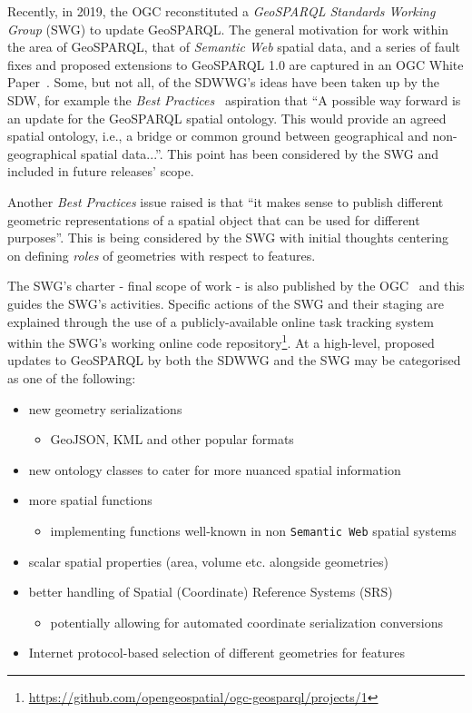 \documentclass[runningheads]{llncs}
\begin{document}
Recently, in 2019, the OGC reconstituted a \textit{GeoSPARQL Standards Working Group} (SWG) to update GeoSPARQL. The general 
motivation for work within the area of GeoSPARQL, that of \textit{Semantic Web} spatial data, and a series of
fault fixes and proposed extensions to GeoSPARQL 1.0 are captured in an OGC White Paper~\cite{geosparqlwhitepaper}. Some,
but not all, of the SDWWG's ideas have been taken up by the SDW, for example the \textit{Best Practices}~\cite{van_den_brink_best_2018}
aspiration that ``A possible way forward is an update for the GeoSPARQL spatial ontology. This would provide an 
agreed spatial ontology, i.e., a bridge or common ground between geographical and non-geographical spatial data...''.
This point has been considered by the SWG and included in future releases' scope. 

Another \textit{Best Practices} issue raised is that ``it makes sense to publish different geometric representations 
of a spatial object that can be used for different purposes''. This is being considered by the SWG with initial
thoughts centering on defining \textit{roles} of geometries with respect to features.

The SWG's charter - final scope of work - is also published by the OGC~\cite{abhayaratna2020ogc} and this guides 
the SWG's activities. Specific actions of the SWG and their staging are explained through the use of a publicly-available 
online task tracking system within the SWG's working online code repository\footnote{\url{https://github.com/opengeospatial/ogc-geosparql/projects/1}}.
At a high-level, proposed updates to GeoSPARQL by both the SDWWG and the SWG may be categorised as one of the following:

\begin{itemize}
    \item new geometry serializations
    \begin{itemize}
        \item GeoJSON, KML and other popular formats
    \end{itemize} 
    \item new ontology classes to cater for more nuanced spatial information
    \item more spatial functions
    \begin{itemize}
        \item implementing functions well-known in non \texttt{Semantic Web} spatial systems
    \end{itemize} 
    \item scalar spatial properties (area, volume etc. alongside geometries)
    \item better handling of Spatial (Coordinate) Reference Systems (SRS)
    \begin{itemize}
        \item potentially allowing for automated coordinate serialization conversions
    \end{itemize} 
    \item Internet protocol-based selection of different geometries for features
\end{itemize}
\end{document}
